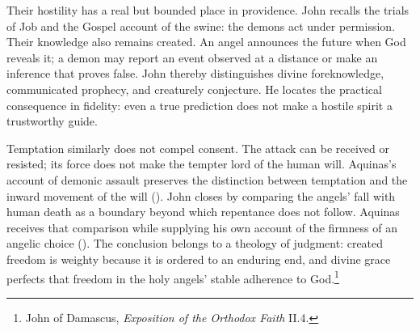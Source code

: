 Their hostility has a real but bounded place in providence. John recalls the trials of Job and the Gospel account of the swine: the demons act under permission. Their knowledge also remains created. An angel announces the future when God reveals it; a demon may report an event observed at a distance or make an inference that proves false. John thereby distinguishes divine foreknowledge, communicated prophecy, and creaturely conjecture. He locates the practical consequence in fidelity: even a true prediction does not make a hostile spirit a trustworthy guide.

Temptation similarly does not compel consent. The attack can be received or resisted; its force does not make the tempter lord of the human will. Aquinas's account of demonic assault preserves the distinction between temptation and the inward movement of the will (). John closes by comparing the angels' fall with human death as a boundary beyond which repentance does not follow. Aquinas receives that comparison while supplying his own account of the firmness of an angelic choice (). The conclusion belongs to a theology of judgment: created freedom is weighty because it is ordered to an enduring end, and divine grace perfects that freedom in the holy angels' stable adherence to God.\footnote{John of Damascus, \emph{Exposition of the Orthodox Faith} II.4.}
